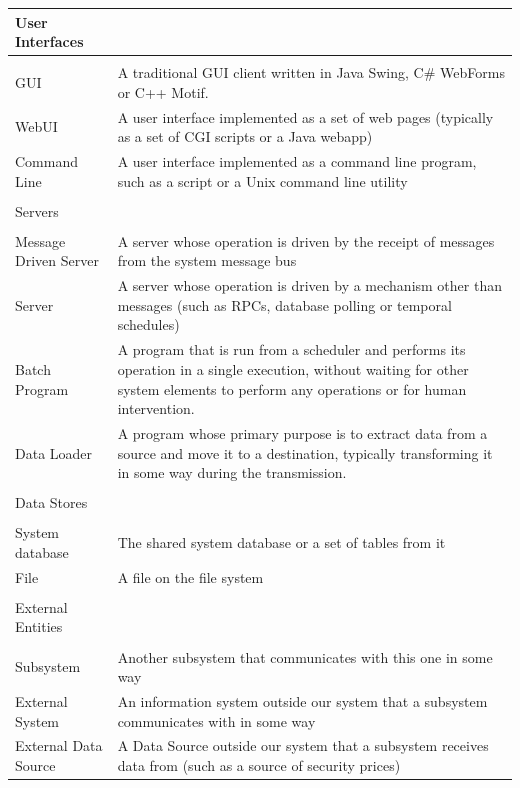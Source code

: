 \begin{table}
\begin{tabular}{| l p{10cm} |}
\hline
User Interfaces \\
\hline
& \\
GUI   & A traditional GUI client written in Java Swing, C\# WebForms or C++ Motif. \\
WebUI & A user interface implemented as a set of web pages (typically as a set of CGI scripts or a Java webapp) \\
Command Line & A user interface implemented as a command line program, such as a script or a Unix command line utility \\
& \\
\hline
Servers & \\
\hline
& \\
Message Driven Server & A server whose operation is driven by the receipt of messages from the system message bus \\
Server                &  A server whose operation is driven by a mechanism other than messages (such as RPCs, database polling or temporal schedules) \\
Batch Program         & A program that is run from a scheduler and performs its operation in a single execution, without waiting for other system elements to perform any operations or for human intervention. \\
Data Loader           & A program whose primary purpose is to extract data from a source and move it to a destination, typically transforming it in some way during the transmission. \\
& \\
\hline
Data Stores  \\
\hline
& \\
System database   &  The shared system database or a set of tables from it \\
File              & A file on the file system \\
& \\
\hline
External Entities  \\
\hline
& \\
Subsystem            & Another subsystem that communicates with this one in some way \\
External System      & An information system outside our system that a subsystem communicates with in some way \\
External Data Source & A Data Source outside our system that a subsystem receives data from (such as a source of security prices) \\
\hline
\end{tabular}
\end{table}

